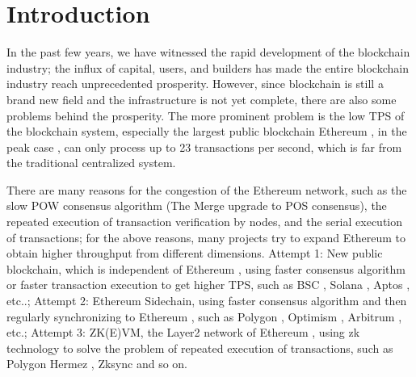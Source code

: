 \section{Introduction}\label{sec:introduction}

In the past few years, we have witnessed the rapid development of the blockchain industry; 
the influx of capital, users, and builders has made the entire blockchain industry reach 
unprecedented prosperity. However, since blockchain is still a brand new field and the
infrastructure is not yet complete, there are also some problems behind the prosperity. 
The more prominent problem is the low TPS of the blockchain system, especially the largest public
blockchain Ethereum \cite{website:Ethereum}, in the peak case \cite{website:Etherscan-chart}, can only process up to 23 
transactions per second, which is far from the traditional centralized system. 

There are many reasons for the congestion of the Ethereum \cite{website:Ethereum} network, such as the slow POW \cite{website:POW} 
consensus algorithm (The Merge upgrade \cite{website:The-Merge-upgrade} to POS \cite{website:POS} consensus), the repeated execution of 
transaction verification by nodes, and the serial execution of transactions; 
for the above reasons, many projects try to expand Ethereum to obtain higher throughput from different dimensions. Attempt 1: New public blockchain, 
which is independent of Ethereum \cite{website:Ethereum}, 
using faster consensus algorithm or faster transaction execution to get higher TPS, such as BSC \cite{website:BSC}, Solana \cite{website:Solana}, 
Aptos \cite{website:Aptos}, etc..; Attempt 2: Ethereum \cite{website:Ethereum} Sidechain, using faster consensus
algorithm and then regularly synchronizing to Ethereum \cite{website:Ethereum}, such as Polygon \cite{website:Polygon}, Optimism \cite{website:Optimism}, Arbitrum \cite{website:Arbitrum},
etc.; Attempt 3: ZK(E)VM, the Layer2 network of Ethereum \cite{website:Ethereum}, using zk technology to 
solve the problem of repeated execution of transactions, such as Polygon Hermez \cite{website:Polygon-Hermez}, 
Zksync \cite{website:Zksync} and so on.


